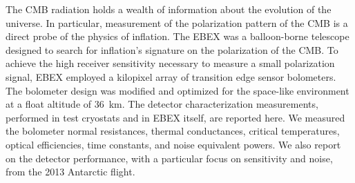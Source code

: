 
The \ac{CMB} radiation holds a wealth of information about the evolution of the universe. 
In particular, measurement of the polarization pattern of the \ac{CMB} is a direct probe of the physics of inflation. 
The \ac{EBEX} was a balloon-borne telescope designed to search for inflation's signature on the polarization of the \ac{CMB}.  
To achieve the high receiver sensitivity necessary to measure a small polarization signal, \ac{EBEX} employed a kilopixel array of transition edge sensor bolometers. 
The bolometer design was modified and optimized for the space-like environment at a float altitude of 36~km. 
The detector characterization measurements, performed in test cryostats and in \ac{EBEX} itself, are reported here. 
We measured the bolometer normal resistances, thermal conductances, critical temperatures, optical efficiencies, time constants, and noise equivalent powers. 
We also report on the detector performance, with a particular focus on sensitivity and noise, from the 2013 Antarctic flight.



